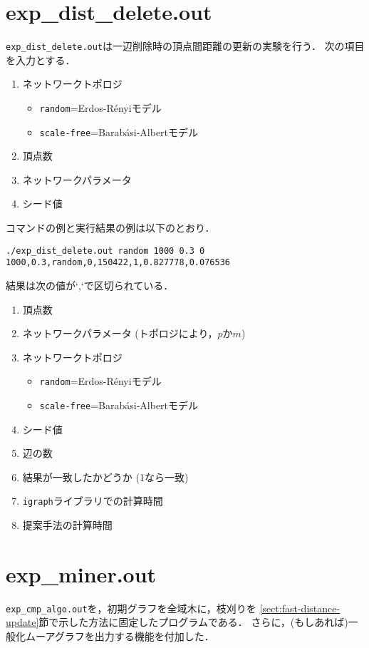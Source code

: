 \section*{exp\_dist\_delete.out}
\texttt{exp\_dist\_delete.out}は一辺削除時の頂点間距離の更新の実験を行う．
次の項目を入力とする．
\begin{enumerate}
\item ネットワークトポロジ
  \begin{itemize}
  \item \verb|random|=Erdos-R{\'e}nyiモデル
  \item \verb|scale-free|=Barab{\'a}si-Albertモデル
  \end{itemize}
\item 頂点数
\item ネットワークパラメータ
\item シード値
\end{enumerate}

コマンドの例と実行結果の例は以下のとおり．
\begin{verbatim}
./exp_dist_delete.out random 1000 0.3 0
1000,0.3,random,0,150422,1,0.827778,0.076536
\end{verbatim}

結果は次の値が`,`で区切られている．
\begin{enumerate}
\item 頂点数
\item ネットワークパラメータ (トポロジにより，$p$か$m$)
\item ネットワークトポロジ
  \begin{itemize}
  \item \verb|random|=Erdos-R{\'e}nyiモデル
  \item \verb|scale-free|=Barab{\'a}si-Albertモデル
  \end{itemize}
\item シード値
\item 辺の数
\item 結果が一致したかどうか (1なら一致)
\item \verb|igraph|ライブラリでの計算時間
\item 提案手法の計算時間
\end{enumerate}

\section*{exp\_miner.out}
\texttt{exp\_cmp\_algo.out}を，初期グラフを全域木に，枝刈りを
\ref{sect:fast-distance-update}節で示した方法に固定したプログラムである．
さらに，(もしあれば)一般化ムーアグラフを出力する機能を付加した．

